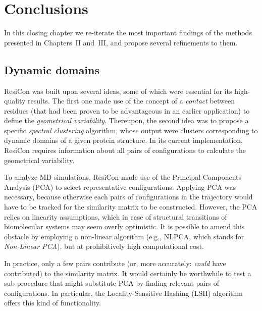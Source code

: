 \chapter{Conclusions}

In this closing chapter we re-iterate the most important findings of the methods presented in Chapters~II and~III, and propose several refinements to them.

\section{Dynamic domains}

ResiCon was built upon several ideas, some of which were essential for its high-quality results.
The first one made use of the concept of a \emph{contact} between residues (that had been proven to be advantageous in an earlier application) to define the \emph{geometrical variability}.
Thereupon, the second idea was to propose a specific \emph{spectral clustering} algorithm, whose output were clusters corresponding to dynamic domains of a given protein structure.
In its current implementation, ResiCon requires information about all pairs of configurations to calculate the geometrical variability. 

To analyze MD simulations, ResiCon made use of the Principal Components Analysis (PCA) to select representative configurations. %
Applying PCA was necessary, because otherwise each pairs of configurations in the trajectory would have to be tracked for the similarity matrix to be constructed.
However, the PCA relies on linearity assumptions, which in case of structural transitions of biomolecular systems may seem overly optimistic.
It is possible to amend this obstacle by employing a non-linear algorithm (e.g., NLPCA, which stands for \emph{Non-Linear PCA}), but at prohibitively high computational cost.

In practice, only a few pairs contribute (or, more accurately: \emph{could} have contributed) to the similarity matrix.
It would certainly be worthwhile to test a sub-procedure that might substitute PCA by finding relevant pairs of configurations.
In particular, the Locality-Sensitive Hashing (LSH) algorithm offers this kind of functionality.

